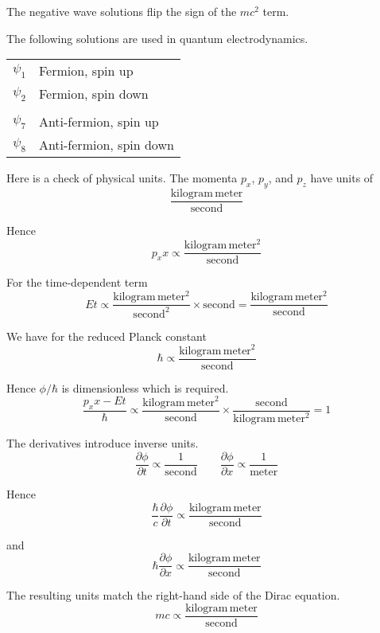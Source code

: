 \documentclass[12pt]{article}
\begin{document}
\noindent
The negative wave solutions flip the sign of the $mc^2$ term.

\bigskip
\noindent
The following solutions are used in quantum electrodynamics.
\begin{center}
\begin{tabular}{ll}
$\psi_1$ & Fermion, spin up\\
$\psi_2$ & Fermion, spin down\\
\\
$\psi_7$ & Anti-fermion, spin up\\
$\psi_8$ & Anti-fermion, spin down
\end{tabular}
\end{center}

\noindent
Here is a check of physical units.
The momenta $p_x$, $p_y$, and $p_z$ have units of
\begin{equation*}
\frac{\text{kilogram}\,\text{meter}}{\text{second}}
\end{equation*}

\noindent
Hence
\begin{equation*}
p_xx\propto\frac{\text{kilogram}\,\text{meter}^2}{\text{second}}
\end{equation*}

\noindent
For the time-dependent term
\begin{equation*}
Et\propto\frac{\text{kilogram}\,\text{meter}^2}{\text{second}^2}\times\text{second}
=\frac{\text{kilogram}\,\text{meter}^2}{\text{second}}
\end{equation*}

\noindent
We have for the reduced Planck constant
\begin{equation*}
\hbar\propto\frac{\text{kilogram}\,\text{meter}^2}{\text{second}}
\end{equation*}

\noindent
Hence $\phi/\hbar$ is dimensionless which is required.
\begin{equation*}
\frac{p_xx-Et}{\hbar}\propto\frac{\text{kilogram}\,\text{meter}^2}{\text{second}}
\times\frac{\text{second}}{\text{kilogram}\,\text{meter}^2}=1
\end{equation*}

\noindent
The derivatives introduce inverse units.
\begin{equation*}
\frac{\partial\phi}{\partial t}\propto\frac{1}{\text{second}}
\qquad
\frac{\partial\phi}{\partial x}\propto\frac{1}{\text{meter}}
\end{equation*}

\noindent
Hence
\begin{equation*}
\frac{\hbar}{c}\frac{\partial\phi}{\partial t}
\propto\frac{\text{kilogram}\,\text{meter}}{\text{second}}
\end{equation*}

\noindent
and
\begin{equation*}
\hbar\frac{\partial\phi}{\partial x}\propto\frac{\text{kilogram}\,\text{meter}}{\text{second}}
\end{equation*}

\noindent
The resulting units match the right-hand side of the Dirac equation.
\begin{equation*}
mc\propto\frac{\text{kilogram}\,\text{meter}}{\text{second}}
\end{equation*}
\end{document}

